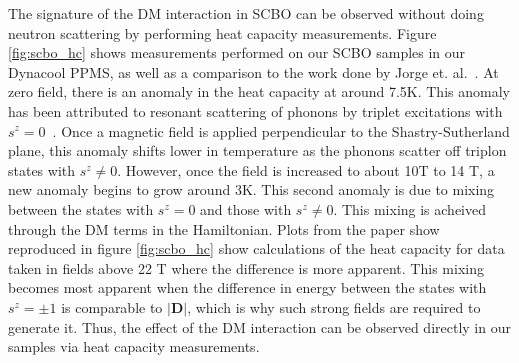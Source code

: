 \documentclass{thesis-umich}
\begin{document}
The signature of the DM interaction in SCBO can be observed without doing neutron scattering by performing heat capacity measurements. Figure \ref{fig:scbo_hc} shows measurements performed on our SCBO samples in our Dynacool PPMS, as well as a comparison to the work done by Jorge et. al.~\cite{Jorge2005}. At zero field, there is an anomaly in the heat capacity at around 7.5K. This anomaly has been attributed to resonant scattering of phonons by triplet excitations with $s^z = 0$~\cite{Hofmann2001}. Once a magnetic field is applied perpendicular to the Shastry-Sutherland plane, this anomaly shifts lower in temperature as the phonons scatter off triplon states with $s^z \neq 0$. However, once the field is increased to about 10T to 14 T, a new anomaly begins to grow around 3K. This second anomaly is due to mixing between the states with $s^z = 0$ and those with $s^z \neq 0$. This mixing is acheived through the DM terms in the Hamiltonian. Plots from the paper show reproduced in figure \ref{fig:scbo_hc} show calculations of the heat capacity for data taken in fields above 22 T where the difference is more apparent. This mixing becomes most apparent when the difference in energy between the states with $s^z = \pm 1$ is comparable to $|\mathbf{D}|$, which is why such strong fields are required to generate it. Thus, the effect of the DM interaction can be observed directly in our samples via heat capacity measurements.
\end{document}
